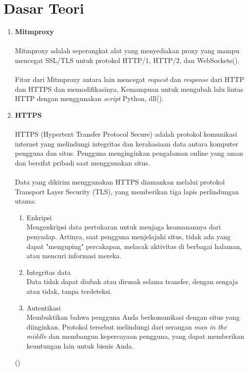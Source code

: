 \documentclass[./bab_2.tex]{subfiles}
\begin{document}
\section{Dasar Teori}
\begin{enumerate}[label=\textbf{\arabic*.}]
  \item \textbf{Mitmproxy}
  \paragraph*{}Mitmproxy adalah seperangkat alat yang
  menyediakan proxy yang mampu mencegat SSL/TLS untuk
  protokol HTTP/1, HTTP/2, dan WebSockets(\cite{mitm}).

  \paragraph*{}Fitur dari Mitmproxy antara lain mencegat
  \textit{request} dan \textit{response} dari  HTTP dan
  HTTPS dan memodifikasinya, Kemampuan untuk mengubah lalu
  lintas HTTP dengan menggunakan \textit{script} Python,
  dll(\cite{mitm}).

  \item \textbf{HTTPS}
  \paragraph*{}HTTPS (Hypertext Transfer Protocol Secure)
  adalah protokol komunikasi internet yang melindungi
  integritas dan kerahasiaan data antara komputer pengguna
  dan situs. Pengguna menginginkan pengalaman online yang
  aman dan bersifat pribadi saat menggunakan situs.

  \paragraph*{}Data yang dikirim menggunakan HTTPS diamankan
  melalui protokol Transport Layer Security (TLS), yang
  memberikan tiga lapis perlindungan utama:
  \begin{enumerate}
    \item Enkripsi\\
      Mengenkripsi data pertukaran untuk menjaga keamanannya
      dari penyadap. Artinya, saat pengguna menjelajahi
      situs, tidak ada yang dapat "menguping" percakapan,
      melacak aktivitas di berbagai halaman, atau mencuri
      informasi mereka.
    \item Integritas data\\
      Data tidak dapat diubah atau dirusak selama transfer,
      dengan sengaja atau tidak, tanpa terdeteksi.
    \item Autentikasi\\
      Membuktikan bahwa pengguna Anda berkomunikasi dengan
      situs yang diinginkan. Protokol tersebut melindungi
      dari serangan \textit{man in the middle} dan membangun
      kepercayaan pengguna, yang dapat memberikan keuntungan
      lain untuk bisnis Anda.
  \end{enumerate}
  (\cite{googledev-https})


\end{enumerate}
\end{document}
